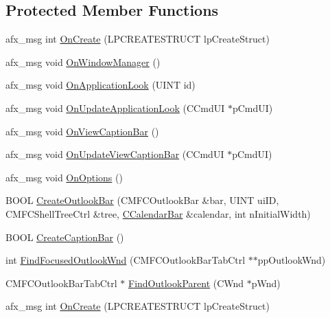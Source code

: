 \subsection*{Protected Member Functions}
\begin{DoxyCompactItemize}
\item 
afx\+\_\+msg int \hyperlink{class_c_main_frame_a48666466fd37412fcaeff75c3b12e0ed}{On\+Create} (L\+P\+C\+R\+E\+A\+T\+E\+S\+T\+R\+U\+C\+T lp\+Create\+Struct)
\item 
afx\+\_\+msg void \hyperlink{class_c_main_frame_ad693f8a88e344c298a1072151f0a3a9c}{On\+Window\+Manager} ()
\item 
afx\+\_\+msg void \hyperlink{class_c_main_frame_af1d93af581b05ad718a9076042a9408d}{On\+Application\+Look} (U\+I\+N\+T id)
\item 
afx\+\_\+msg void \hyperlink{class_c_main_frame_aa6a07aed318ec6813316612c272ba8c1}{On\+Update\+Application\+Look} (C\+Cmd\+U\+I $\ast$p\+Cmd\+U\+I)
\item 
afx\+\_\+msg void \hyperlink{class_c_main_frame_a9353bf40179d72b097521a615996fb43}{On\+View\+Caption\+Bar} ()
\item 
afx\+\_\+msg void \hyperlink{class_c_main_frame_aa0dcb97572018128014335e4504e2ea1}{On\+Update\+View\+Caption\+Bar} (C\+Cmd\+U\+I $\ast$p\+Cmd\+U\+I)
\item 
afx\+\_\+msg void \hyperlink{class_c_main_frame_a9e4f5f354212b181534e41a5fe1992c5}{On\+Options} ()
\item 
B\+O\+O\+L \hyperlink{class_c_main_frame_a9b5f3891a27c2721f65ff7501cdb2587}{Create\+Outlook\+Bar} (C\+M\+F\+C\+Outlook\+Bar \&bar, U\+I\+N\+T ui\+I\+D, C\+M\+F\+C\+Shell\+Tree\+Ctrl \&tree, \hyperlink{class_c_calendar_bar}{C\+Calendar\+Bar} \&calendar, int n\+Initial\+Width)
\item 
B\+O\+O\+L \hyperlink{class_c_main_frame_af7a136a684b2cda7661eb0884c4686ea}{Create\+Caption\+Bar} ()
\item 
int \hyperlink{class_c_main_frame_a309933cff971e445cf51237d88f2da64}{Find\+Focused\+Outlook\+Wnd} (C\+M\+F\+C\+Outlook\+Bar\+Tab\+Ctrl $\ast$$\ast$pp\+Outlook\+Wnd)
\item 
C\+M\+F\+C\+Outlook\+Bar\+Tab\+Ctrl $\ast$ \hyperlink{class_c_main_frame_a1d102151b30621fa70420aa555d60e29}{Find\+Outlook\+Parent} (C\+Wnd $\ast$p\+Wnd)
\item 
afx\+\_\+msg int \hyperlink{class_c_main_frame_a85515c93cf0a0193cbf21ed75ebd02e8}{On\+Create} (L\+P\+C\+R\+E\+A\+T\+E\+S\+T\+R\+U\+C\+T lp\+Create\+Struct)
\end{DoxyCompactItemize}
